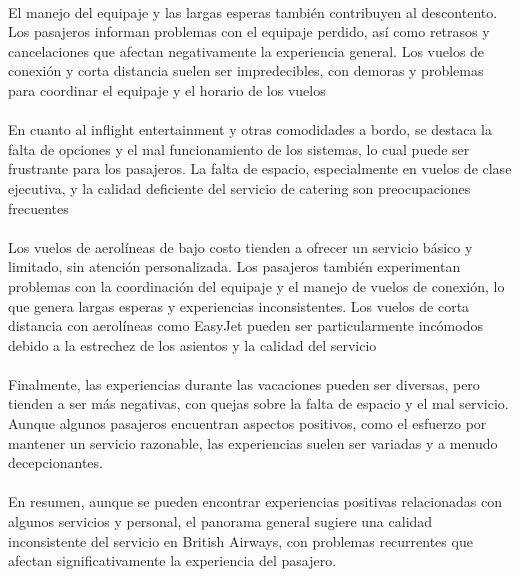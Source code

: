 \documentclass{report}
\begin{document}
{                    \paragraph*{}{
                        El manejo del equipaje y las largas esperas también contribuyen al descontento. Los pasajeros informan problemas con el equipaje perdido, así como retrasos y cancelaciones que afectan negativamente la experiencia general. Los vuelos de conexión y corta distancia suelen ser impredecibles, con demoras y problemas para coordinar el equipaje y el horario de los vuelos
                    }
                    \paragraph*{}{
                        En cuanto al inflight entertainment y otras comodidades a bordo, se destaca la falta de opciones y el mal funcionamiento de los sistemas, lo cual puede ser frustrante para los pasajeros. La falta de espacio, especialmente en vuelos de clase ejecutiva, y la calidad deficiente del servicio de catering son preocupaciones frecuentes
                    }
                    \paragraph*{}{
                        Los vuelos de aerolíneas de bajo costo tienden a ofrecer un servicio básico y limitado, sin atención personalizada. Los pasajeros también experimentan problemas con la coordinación del equipaje y el manejo de vuelos de conexión, lo que genera largas esperas y experiencias inconsistentes. Los vuelos de corta distancia con aerolíneas como EasyJet pueden ser particularmente incómodos debido a la estrechez de los asientos y la calidad del servicio
                    }
                    \paragraph*{}{
                        Finalmente, las experiencias durante las vacaciones pueden ser diversas, pero tienden a ser más negativas, con quejas sobre la falta de espacio y el mal servicio. Aunque algunos pasajeros encuentran aspectos positivos, como el esfuerzo por mantener un servicio razonable, las experiencias suelen ser variadas y a menudo decepcionantes.
                    }
                    \paragraph*{}{
                        En resumen, aunque se pueden encontrar experiencias positivas relacionadas con algunos servicios y personal, el panorama general sugiere una calidad inconsistente del servicio en British Airways, con problemas recurrentes que afectan significativamente la experiencia del pasajero.
                    }
}
\end{document}
